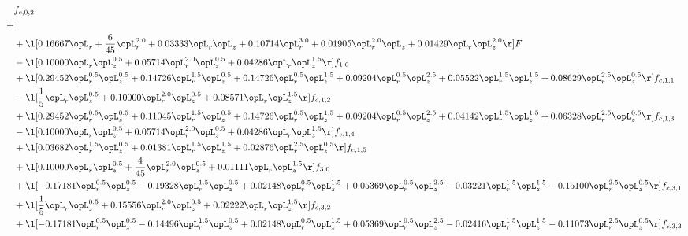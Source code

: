 \begin{alignat}{2} 
\label{eq:f_02_1} 
& f_{c,0,2} \nonumber \\ 
 = \\ 
& + \l[  0.16667 \opL_r + \frac{6}{45} \opL_r^{2.0} +  0.03333 \opL_r \opL_z +  0.10714 \opL_r^{3.0} +  0.01905 \opL_r^{2.0} \opL_z +  0.01429 \opL_r \opL_z^{2.0}  \r] F \nonumber \\ 
& - \l[  0.10000 \opL_r \opL_z^{0.5} +  0.05714 \opL_r^{2.0} \opL_z^{0.5} +  0.04286 \opL_r \opL_z^{1.5}  \r] f_{1,0} \nonumber \\ 
& + \l[  0.29452 \opL_r^{0.5} \opL_z^{0.5} +  0.14726 \opL_r^{1.5} \opL_z^{0.5} +  0.14726 \opL_r^{0.5} \opL_z^{1.5} +  0.09204 \opL_r^{0.5} \opL_z^{2.5} +  0.05522 \opL_r^{1.5} \opL_z^{1.5} +  0.08629 \opL_r^{2.5} \opL_z^{0.5}  \r] f_{c,1,1} \nonumber \\ 
& - \l[ \frac{1}{5} \opL_r \opL_z^{0.5} +  0.10000 \opL_r^{2.0} \opL_z^{0.5} +  0.08571 \opL_r \opL_z^{1.5}  \r] f_{c,1,2} \nonumber \\ 
& + \l[  0.29452 \opL_r^{0.5} \opL_z^{0.5} +  0.11045 \opL_r^{1.5} \opL_z^{0.5} +  0.14726 \opL_r^{0.5} \opL_z^{1.5} +  0.09204 \opL_r^{0.5} \opL_z^{2.5} +  0.04142 \opL_r^{1.5} \opL_z^{1.5} +  0.06328 \opL_r^{2.5} \opL_z^{0.5}  \r] f_{c,1,3} \nonumber \\ 
& - \l[  0.10000 \opL_r \opL_z^{0.5} +  0.05714 \opL_r^{2.0} \opL_z^{0.5} +  0.04286 \opL_r \opL_z^{1.5}  \r] f_{c,1,4} \nonumber \\ 
& + \l[  0.03682 \opL_r^{1.5} \opL_z^{0.5} +  0.01381 \opL_r^{1.5} \opL_z^{1.5} +  0.02876 \opL_r^{2.5} \opL_z^{0.5}  \r] f_{c,1,5} \nonumber \\ 
& + \l[  0.10000 \opL_r \opL_z^{0.5} + \frac{4}{45} \opL_r^{2.0} \opL_z^{0.5} +  0.01111 \opL_r \opL_z^{1.5}  \r] f_{3,0} \nonumber \\ 
& + \l[  -0.17181 \opL_r^{0.5} \opL_z^{0.5}   -0.19328 \opL_r^{1.5} \opL_z^{0.5} +  0.02148 \opL_r^{0.5} \opL_z^{1.5} +  0.05369 \opL_r^{0.5} \opL_z^{2.5}   -0.03221 \opL_r^{1.5} \opL_z^{1.5}   -0.15100 \opL_r^{2.5} \opL_z^{0.5}  \r] f_{c,3,1} \nonumber \\ 
& + \l[ \frac{1}{5} \opL_r \opL_z^{0.5} +  0.15556 \opL_r^{2.0} \opL_z^{0.5} +  0.02222 \opL_r \opL_z^{1.5}  \r] f_{c,3,2} \nonumber \\ 
& + \l[  -0.17181 \opL_r^{0.5} \opL_z^{0.5}   -0.14496 \opL_r^{1.5} \opL_z^{0.5} +  0.02148 \opL_r^{0.5} \opL_z^{1.5} +  0.05369 \opL_r^{0.5} \opL_z^{2.5}   -0.02416 \opL_r^{1.5} \opL_z^{1.5}   -0.11073 \opL_r^{2.5} \opL_z^{0.5}  \r] f_{c,3,3} \nonumber \\ 

\end{alignat}
